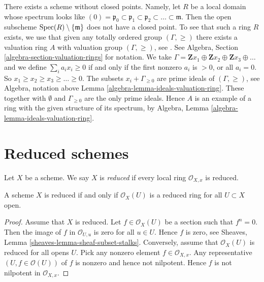\begin{example}
\label{example-scheme-without-closed-points}
There exists a scheme without closed points.
Namely, let $R$ be a local domain whose spectrum
looks like
$(0) = \mathfrak p_0 \subset \mathfrak p_1 \subset \mathfrak p_2
\subset \ldots \subset \mathfrak m$. Then the open subscheme
$\mathop{\mathrm{Spec}}(R) \setminus \{\mathfrak m\}$ does not have
a closed point. To see that such a ring $R$ exists, we use
that given any totally ordered group $(\Gamma, \geq)$
there exists a valuation ring $A$ with valuation group $(\Gamma, \geq)$,
see \cite{Krull}. See Algebra, Section \ref{algebra-section-valuation-rings}
for notation. We take
$\Gamma = \mathbf{Z}x_1 \oplus \mathbf{Z}x_2 \oplus \mathbf{Z}x_3 \oplus
\ldots$ and we define $\sum_i a_i x_i \geq 0$ if and only
if the first nonzero $a_i$ is $> 0$, or all $a_i = 0$.
So $x_1 \geq x_2 \geq x_3 \geq  \ldots \geq 0$.
The subsets $x_i + \Gamma_{\geq 0}$ are prime ideals
of $(\Gamma, \geq)$, see Algebra, notation above
Lemma \ref{algebra-lemma-ideals-valuation-ring}. These together
with $\emptyset$ and $\Gamma_{\geq 0}$ are the only prime ideals.
Hence $A$ is an example of a ring with the given structure of
its spectrum, by
Algebra, Lemma \ref{algebra-lemma-ideals-valuation-ring}.
\end{example}



















\section{Reduced schemes}
\label{section-reduced}

\begin{definition}
\label{definition-reduced}
Let $X$ be a scheme. We say $X$ is {\it reduced} if every local ring
$\mathcal{O}_{X, x}$ is reduced.
\end{definition}

\begin{lemma}
\label{lemma-reduced}
A scheme $X$ is reduced if and only if $\mathcal{O}_X(U)$
is a reduced ring for all $U \subset X$ open.
\end{lemma}

\begin{proof}
Assume that $X$ is reduced.
Let $f \in \mathcal{O}_X(U)$ be a section such that $f^n = 0$.
Then the image of $f$ in $\mathcal{O}_{U, u}$ is zero for
all $u \in U$. Hence $f$ is zero, see
Sheaves, Lemma \ref{sheaves-lemma-sheaf-subset-stalks}.
Conversely, assume that $\mathcal{O}_X(U)$ is reduced
for all opens $U$. Pick any nonzero element $f \in \mathcal{O}_{X, x}$.
Any representative $(U, f \in \mathcal{O}(U))$  of $f$ is nonzero and
hence not nilpotent. Hence $f$ is not nilpotent in $\mathcal{O}_{X, x}$.
\end{proof}

